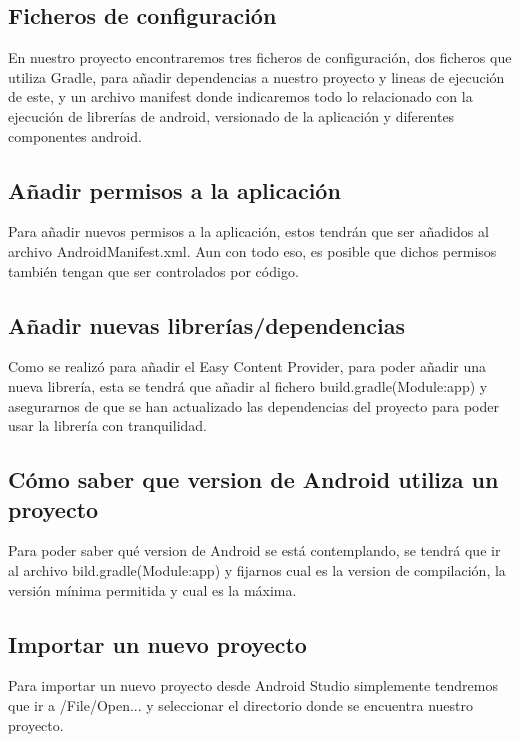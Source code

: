 \subsection{Ficheros de configuración}
En nuestro proyecto encontraremos tres ficheros de configuración, dos ficheros que utiliza Gradle, para añadir dependencias a nuestro proyecto y lineas de ejecución de este, y un archivo manifest donde indicaremos todo lo relacionado con la ejecución de librerías de android, versionado de la aplicación y diferentes componentes android.

\subsection{Añadir permisos a la aplicación}
Para añadir nuevos permisos a la aplicación, estos tendrán que ser añadidos al archivo AndroidManifest.xml. Aun con todo eso, es posible que dichos permisos también tengan que ser controlados por código.

\subsection{Añadir nuevas librerías/dependencias}
Como se realizó para añadir el Easy Content Provider\cite{easycontent}, para poder añadir una nueva librería, esta se tendrá que añadir al fichero build.gradle(Module:app) y asegurarnos de que se han actualizado las dependencias del proyecto para poder usar la librería con tranquilidad.

\subsection{Cómo saber que version de Android utiliza un proyecto}
Para poder saber qué version de Android se está contemplando, se tendrá que ir al archivo bild.gradle(Module:app) y fijarnos cual es la version de compilación, la versión mínima permitida y cual es la máxima.

\subsection{Importar un nuevo proyecto}
Para importar un nuevo proyecto desde Android Studio simplemente tendremos que ir a /File/Open... y seleccionar el directorio donde se encuentra nuestro proyecto.

